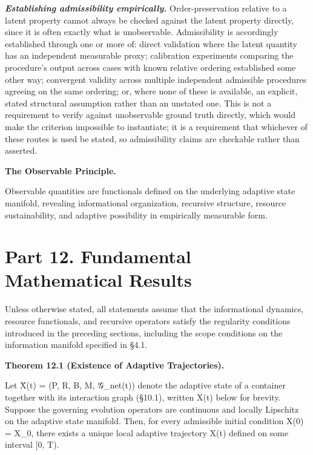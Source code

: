 \documentclass[
]{article}
\begin{document}
\emph{\textbf{Establishing admissibility empirically.}}
Order-preservation relative to a latent property cannot always be
checked against the latent property directly, since it is often exactly
what is unobservable. Admissibility is accordingly established through
one or more of: direct validation where the latent quantity has an
independent measurable proxy; calibration experiments comparing the
procedure's output across cases with known relative ordering established
some other way; convergent validity across multiple independent
admissible procedures agreeing on the same ordering; or, where none of
these is available, an explicit, stated structural assumption rather
than an unstated one. This is not a requirement to verify against
unobservable ground truth directly, which would make the criterion
impossible to instantiate; it is a requirement that whichever of these
routes is used be stated, so admissibility claims are checkable rather
than asserted.

\textbf{The Observable Principle.}

Observable quantities are functionals defined on the underlying adaptive
state manifold, revealing informational organization, recursive
structure, resource sustainability, and adaptive possibility in
empirically measurable form.

\hypertarget{part-12.-fundamental-mathematical-results}{%
\section{Part 12. Fundamental Mathematical
Results}\label{part-12.-fundamental-mathematical-results}}

Unless otherwise stated, all statements assume that the informational
dynamics, resource functionals, and recursive operators satisfy the
regularity conditions introduced in the preceding sections, including
the scope conditions on the information manifold specified in §4.1.

\textbf{Theorem 12.1 (Existence of Adaptive Trajectories).}

Let X̄(t) = (P, R, B, M, 𝒢\_net(t)) denote the adaptive state of a
container together with its interaction graph (§10.1), written X(t)
below for brevity.
Suppose the governing evolution operators are continuous and locally
Lipschitz on the adaptive state manifold. Then, for every admissible
initial condition X(0) = X\_0, there exists a unique local adaptive
trajectory X(t) defined on some interval {[}0, T).
\end{document}
